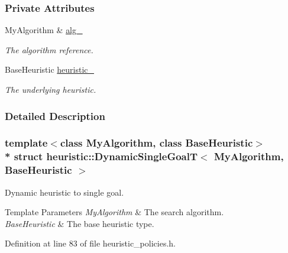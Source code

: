 \subsubsection*{Private Attributes}
\begin{DoxyCompactItemize}
\item 
My\+Algorithm \& \hyperlink{structheuristic_1_1DynamicSingleGoalT_aadb2a443664bfb3b19c862136e6c5074}{alg\+\_\+}\hypertarget{structheuristic_1_1DynamicSingleGoalT_aadb2a443664bfb3b19c862136e6c5074}{}\label{structheuristic_1_1DynamicSingleGoalT_aadb2a443664bfb3b19c862136e6c5074}

\begin{DoxyCompactList}\small\item\em The algorithm reference. \end{DoxyCompactList}\item 
Base\+Heuristic \hyperlink{structheuristic_1_1DynamicSingleGoalT_ae326f7e4948cd4514d85353bf1d67317}{heuristic\+\_\+}\hypertarget{structheuristic_1_1DynamicSingleGoalT_ae326f7e4948cd4514d85353bf1d67317}{}\label{structheuristic_1_1DynamicSingleGoalT_ae326f7e4948cd4514d85353bf1d67317}

\begin{DoxyCompactList}\small\item\em The underlying heuristic. \end{DoxyCompactList}\end{DoxyCompactItemize}


\subsubsection{Detailed Description}
\subsubsection*{template$<$class My\+Algorithm, class Base\+Heuristic$>$\\*
struct heuristic\+::\+Dynamic\+Single\+Goal\+T$<$ My\+Algorithm, Base\+Heuristic $>$}

Dynamic heuristic to single goal. 


\begin{DoxyTemplParams}{Template Parameters}
{\em My\+Algorithm} & The search algorithm. \\
\hline
{\em Base\+Heuristic} & The base heuristic type. \\
\hline
\end{DoxyTemplParams}


Definition at line 83 of file heuristic\+\_\+policies.\+h.



